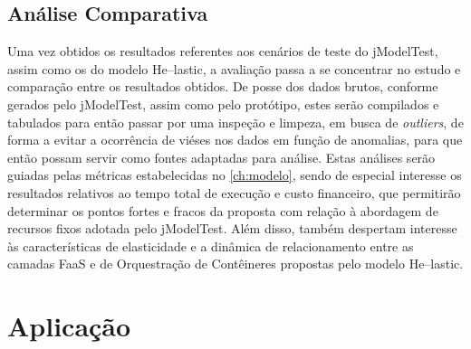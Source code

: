 \documentclass[english,brazilian]{UNISINOSmonografia} %
\begin{document}
\subsection{Análise Comparativa}


Uma vez obtidos os resultados referentes aos cenários de teste do jModelTest, assim como os do modelo \textsf{He}--lastic, a avaliação passa a se concentrar no estudo e comparação entre os resultados obtidos.
%
De posse dos dados brutos, conforme gerados pelo jModelTest, assim como pelo protótipo, estes serão compilados e tabulados para então passar por uma inspeção e limpeza, em busca de \textit{outliers}, de forma a evitar a ocorrência de viéses nos dados em função de anomalias, para que então possam servir como fontes adaptadas para análise.
%
Estas análises serão guiadas pelas métricas estabelecidas no \autoref{ch:modelo}, sendo de especial interesse os resultados relativos ao tempo total de execução e custo financeiro, que permitirão determinar os pontos fortes e fracos da proposta com relação à abordagem de recursos fixos adotada pelo jModelTest.
%
Além disso, também despertam interesse às características de elasticidade e a dinâmica de relacionamento entre as camadas FaaS e de Orquestração de Contêineres propostas pelo modelo \textsf{He}--lastic.









\section{Aplicação}
\end{document}
